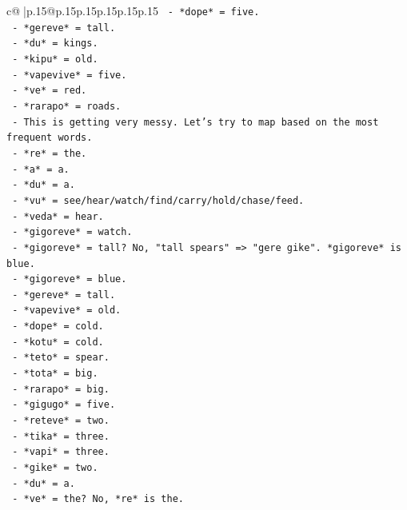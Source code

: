 \documentclass{article}
\begin{document}
{\begin{supertabular}{c@{$\;$}|p{.15\linewidth}@{}p{.15\linewidth}p{.15\linewidth}p{.15\linewidth}p{.15\linewidth}p{.15\linewidth}}
{{{\texttt{              {-} *dope* = five.} \\
\texttt{              {-} *gereve* = tall.} \\
\texttt{              {-} *du* = kings.} \\
\texttt{              {-} *kipu* = old.} \\
\texttt{              {-} *vapevive* = five.} \\
\texttt{              {-} *ve* = red.} \\
\texttt{              {-} *rarapo* = roads.} \\
\texttt{            {-} This is getting very messy. Let's try to map based on the most frequent words.} \\
\texttt{            {-} *re* = the.} \\
\texttt{            {-} *a* = a.} \\
\texttt{            {-} *du* = a.} \\
\texttt{            {-} *vu* = see/hear/watch/find/carry/hold/chase/feed.} \\
\texttt{            {-} *veda* = hear.} \\
\texttt{            {-} *gigoreve* = watch.} \\
\texttt{            {-} *gigoreve* = tall? No, "tall spears" => "gere gike". *gigoreve* is blue.} \\
\texttt{            {-} *gigoreve* = blue.} \\
\texttt{            {-} *gereve* = tall.} \\
\texttt{            {-} *vapevive* = old.} \\
\texttt{            {-} *dope* = cold.} \\
\texttt{            {-} *kotu* = cold.} \\
\texttt{            {-} *teto* = spear.} \\
\texttt{            {-} *tota* = big.} \\
\texttt{            {-} *rarapo* = big.} \\
\texttt{            {-} *gigugo* = five.} \\
\texttt{            {-} *reteve* = two.} \\
\texttt{            {-} *tika* = three.} \\
\texttt{            {-} *vapi* = three.} \\
\texttt{            {-} *gike* = two.} \\
\texttt{            {-} *du* = a.} \\
\texttt{            {-} *ve* = the? No, *re* is the.} \\
}}}
\end{supertabular}}
\end{document}
